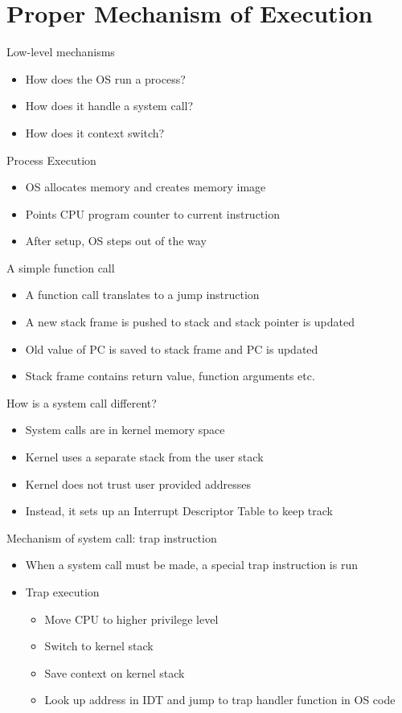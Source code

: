 \documentclass[12pt]{article}
\begin{document}
\section{Proper Mechanism of Execution}

Low-level mechanisms
\begin{itemize}
    \item How does the OS run a process?
    \item How does it handle a system call?
    \item How does it context switch?
\end{itemize}

Process Execution
\begin{itemize}
    \item OS allocates memory and creates memory image
    \item Points CPU program counter to current instruction
    \item After setup, OS steps out of the way
\end{itemize}

A simple function call
\begin{itemize}
    \item A function call translates to a jump instruction
    \item A new stack frame is pushed to stack and stack pointer is updated
    \item Old value of PC is saved to stack frame and PC is updated
    \item Stack frame contains return value, function arguments etc.
\end{itemize}

How is a system call different?
\begin{itemize}
    \item System calls are in kernel memory space
    \item Kernel uses a separate stack from the user stack
    \item Kernel does not trust user provided addresses
    \item Instead, it sets up an Interrupt Descriptor Table to keep track
\end{itemize}

Mechanism of system call: trap instruction
\begin{itemize}
    \item When a system call must be made, a special trap instruction is run
    \item Trap execution
    \begin{itemize}
        \item Move CPU to higher privilege level
        \item Switch to kernel stack
        \item Save context on kernel stack
        \item Look up address in IDT and jump to trap handler function in OS code
    \end{itemize}
\end{itemize}
\end{document}
